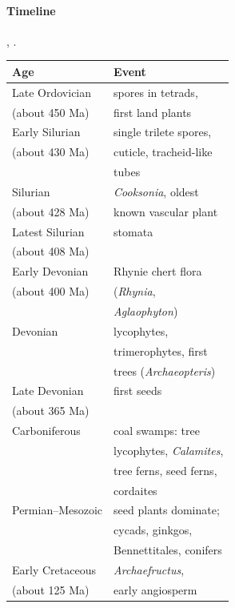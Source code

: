 \paragraph{Timeline}
\cite[Chapters 3--4]{willis2002evolution},
\cite[Chapters 17--18]{evert2013raven}.
\begin{center}
\begin{tabular}{ll}
Age & Event \\
\hline
Late Ordovician & spores in tetrads, \\
(about 450 Ma) & first land plants \\
Early Silurian & single trilete spores, \\
(about 430 Ma) & cuticle, tracheid-like \\
& tubes \\
Silurian & \emph{Cooksonia}, oldest \\
(about 428 Ma) & known vascular plant \\
Latest Silurian & stomata \\
(about 408 Ma) & \\
Early Devonian & Rhynie chert flora \\
(about 400 Ma) & (\emph{Rhynia}, \\
& \emph{Aglaophyton}) \\
Devonian & lycophytes, \\
& trimerophytes, first \\
& trees (\emph{Archaeopteris}) \\
Late Devonian & first seeds \\
(about 365 Ma) & \\
Carboniferous & coal swamps: tree \\
& lycophytes, \emph{Calamites}, \\
& tree ferns, seed ferns, \\
& cordaites \\
Permian--Mesozoic & seed plants dominate; \\
& cycads, ginkgos, \\
& Bennettitales, conifers \\
Early Cretaceous & \emph{Archaefructus}, \\
(about 125 Ma) & early angiosperm \\
\end{tabular}
\end{center}

